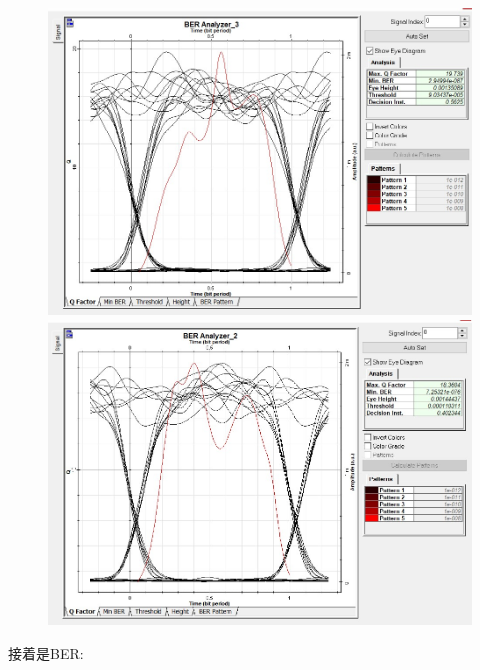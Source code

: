 \documentclass[12pt]{article}
\begin{document}
\begin{figure}[H]
\begin{minipage}[t]{0.5\linewidth}
        \caption{}
        \label{fig:side:b}
      \end{minipage}
	  \begin{minipage}[t]{0.5\linewidth}
        \centering
        \includegraphics[scale=0.3]{Q-factor (3).jpg}
        \caption{}
        \label{fig:side:a}
      \end{minipage}%
      \begin{minipage}[t]{0.5\linewidth}
        \centering
        \includegraphics[scale=0.3]{Q-factor (4).jpg}
        \caption{}
        \label{fig:side:b}
      \end{minipage}
\end{figure}

接着是BER:
\end{document}
